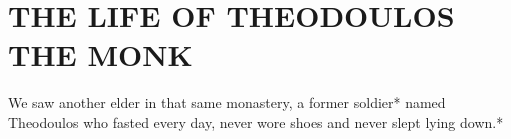 \chapter{THE LIFE OF THEODOULOS THE MONK}

We saw another elder in that same monastery, a former soldier* named Theodoulos who fasted every day, never wore shoes and never slept lying down.*
